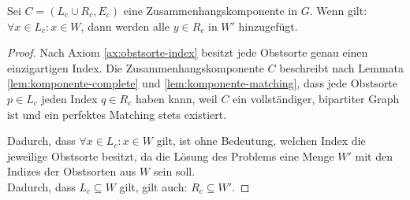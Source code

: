 \begin{lemma}\label{lem:komponente-all-wunschliste}
Sei $C = (L_c \cup R_c, E_c)$ eine Zusammenhangskomponente in $G$.
Wenn gilt: $\forall x \in L_c : x \in W$, dann werden alle $y \in R_c$ in $W'$ hinzugefügt.
\end{lemma}
\begin{proof} 
Nach Axiom \ref{ax:obstsorte-index} besitzt jede Obstsorte genau einen einzigartigen Index.
Die Zusammenhangskomponente $C$ beschreibt nach Lemmata \ref{lem:komponente-complete} und \ref{lem:komponente-matching},
dass jede Obstsorte $p \in L_c$ jeden Index $q \in R_c$ haben kann, weil $C$ ein vollständiger, bipartiter Graph ist und ein perfektes Matching stets existiert.

Dadurch, dass $\forall x \in L_c : x \in W$ gilt,
ist ohne Bedeutung, welchen Index die jeweilige Obstsorte besitzt, da
 die Lösung des Problems eine Menge $W'$ mit den Indizes der Obstsorten aus $W$ sein soll.\\
Dadurch, dass $L_c \subseteq W$ gilt, gilt auch: $R_c \subseteq W'$. 
\end{proof}
